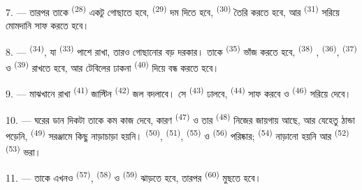 7. --- তারপর তাকে  \textsuperscript{(28)} একটু
গোছাতে হবে,  \textsuperscript{(29)} দম দিতে হবে,
 \textsuperscript{(30)} তৈরি করতে হবে, আর 
\textsuperscript{(31)} সরিয়ে মোমদানি সাফ করতে হবে।

\VUsaut{5.0mm}
\VUsaut{3.0mm}

8. ---  \textsuperscript{(34)}, যা 
\textsuperscript{(33)} পাশে রাখা, তারও গোছানোর বড় দরকার। তাকে 
\textsuperscript{(35)} ভাঁজ করতে হবে, 
\textsuperscript{(38)} ,  \textsuperscript{(36)},
 \textsuperscript{(37)} ও  \textsuperscript{(39)} রাখতে
হবে, আর টেবিলের ঢাকনা  \textsuperscript{(40)} দিয়ে বন্ধ করতে হবে।

9. --- মাঝখানে রাখা  \textsuperscript{(41)} জাস্টিন
 \textsuperscript{(42)} জল বদলাবে। সে 
\textsuperscript{(43)}  ঢালবে, 
\textsuperscript{(44)} সাফ করবে ও  \textsuperscript{(46)}
সরিয়ে দেবে।

10. --- ঘরের ডান দিকটা তাকে কম কাজ দেবে, কারণ 
\textsuperscript{(47)} ও তার  \textsuperscript{(48)} নিজের জায়গায়
আছে, আর যেহেতু ঠান্ডা পড়েনি,  \textsuperscript{(49)}
সরঞ্জামে কিছু নাড়াচাড়া হয়নি।  \textsuperscript{(50)},
 \textsuperscript{(51)},  \textsuperscript{(55)}
ও  \textsuperscript{(56)} পরিষ্কার; 
\textsuperscript{(54)} নাড়ানো হয়নি আর 
\textsuperscript{(52)}  \textsuperscript{(53)} ভরা।



11. --- তাকে এখনও  \textsuperscript{(57)},
 \textsuperscript{(58)} ও 
\textsuperscript{(59)} ঝাড়তে হবে, তারপর  \textsuperscript{(60)}
মুছতে হবে।

